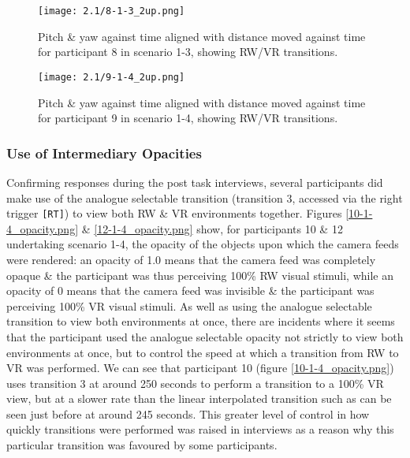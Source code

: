 \begin{figure}[h]
	\begin{center}
	\texttt{[image: 2.1/8-1-3\_2up.png]}
	\caption{Pitch \& yaw against time aligned with distance moved against time for participant 8 in scenario 1-3, showing RW/VR transitions.}
	\label{8-1-3_2up.png}
	\end{center}
\end{figure}

\begin{figure}[h]
	\begin{center}
	\texttt{[image: 2.1/9-1-4\_2up.png]}
	\caption{Pitch \& yaw against time aligned with distance moved against time for participant 9 in scenario 1-4, showing RW/VR transitions.}
	\label{9-1-4_2up.png}
	\end{center}
\end{figure}


\subsubsection{Use of Intermediary Opacities}

Confirming responses during the post task interviews, several participants did make use of the analogue selectable transition (transition 3, accessed via the right trigger \texttt{[RT]}) to view both RW \& VR environments together. Figures \ref{10-1-4_opacity.png} \& \ref{12-1-4_opacity.png} show, for participants 10 \& 12 undertaking scenario 1-4, the opacity of the objects upon which the camera feeds were rendered: an opacity of 1.0 means that the camera feed was completely opaque \& the participant was thus perceiving 100\% RW visual stimuli, while an opacity of 0 means that the camera feed was invisible \& the participant was perceiving 100\% VR visual stimuli. As well as using the analogue selectable transition to view both environments at once, there are incidents where it seems that the participant used the analogue selectable opacity not strictly to view both environments at once, but to control the speed at which a transition from RW to VR was performed. We can see that participant 10 (figure \ref{10-1-4_opacity.png}) uses transition 3 at around 250 seconds to perform a transition to a 100\% VR view, but at a slower rate than the linear interpolated transition such as can be seen just before at around 245 seconds. This greater level of control in how quickly transitions were performed was raised in interviews as a reason why this particular transition was favoured by some participants.

